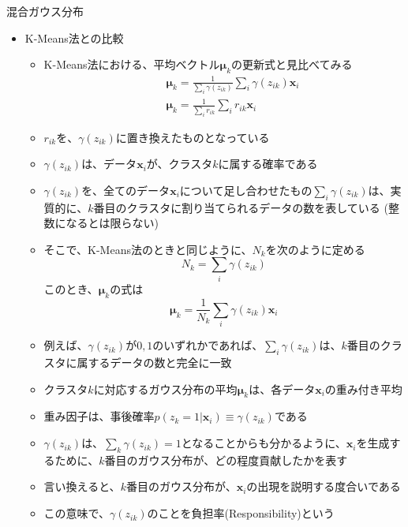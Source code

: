 \documentclass[dvipdfmx,notheorems,t]{beamer}
\begin{document}
\begin{frame}{混合ガウス分布}

\begin{itemize}	
	\item K-Means法との比較
	\begin{itemize}
		\item K-Means法における、平均ベクトル$\bm{\mu}_k$の更新式と見比べてみる
		\begin{eqnarray}
			&& \bm{\mu}_k = \frac{1}{\sum_i \gamma(z_{ik})} \sum_i \gamma(z_{ik}) \bm{x}_i \nonumber \\
			&& \bm{\mu}_k = \frac{1}{\sum_i r_{ik}} \sum_i r_{ik} \bm{x}_i
		\end{eqnarray}
		\item $r_{ik}$を、$\gamma(z_{ik})$に置き換えたものとなっている
		\newline
		\item $\gamma(z_{ik})$は、データ$\bm{x}_i$が、クラスタ$k$に属する確率である
		\newline
		\item $\gamma(z_{ik})$を、全てのデータ$\bm{x}_i$について足し合わせたもの$\sum_i \gamma(z_{ik})$は、実質的に、\color{red}$k$番目のクラスタに割り当てられるデータの数\normalcolor を表している (整数になるとは限らない)
		\item そこで、K-Means法のときと同じように、$N_k$を次のように定める
		\begin{equation}
			N_k = \sum_i \gamma(z_{ik})
		\end{equation}
		このとき、$\bm{\mu}_k$の式は
		\begin{equation}
			\bm{\mu}_k = \frac{1}{N_k} \sum_i \gamma(z_{ik}) \bm{x}_i
		\end{equation}
		
		\item 例えば、$\gamma(z_{ik})$が$0, 1$のいずれかであれば、$\sum_i \gamma(z_{ik})$は、$k$番目のクラスタに属するデータの数と完全に一致
		\newline
		\item クラスタ$k$に対応するガウス分布の平均$\bm{\mu}_k$は、各データ$\bm{x}_i$の重み付き平均
		\item 重み因子は、事後確率$p(z_k = 1 | \bm{x}_i) \equiv \gamma(z_{ik})$である
		\newline
		\item $\gamma(z_{ik})$は、$\sum_k \gamma(z_{ik}) = 1$となることからも分かるように、\color{red}$\bm{x}_i$を生成するために、$k$番目のガウス分布が、どの程度貢献したか\normalcolor を表す
		\item 言い換えると、\color{red}$k$番目のガウス分布が、$\bm{x}_i$の出現を説明する度合い\normalcolor である
		\newline
		\item この意味で、$\gamma(z_{ik})$のことを\alert{負担率}(Responsibility)という
	\end{itemize}
\end{itemize}

\end{frame}
\end{document}
